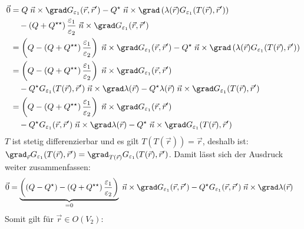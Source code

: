 		  	\begin{equation}\begin{split}
		  			\vec{0} &= Q \; \vec{n}\times \grad G_{\varepsilon_1}(\vec{r} , \vec{r}' ) - Q^\star\; \vec{n}\times\grad \left( \lambda(\vec{r} ) G_{\varepsilon_1}(T(\vec{r} ), \vec{r}' ) \right)\\
		  			&\quad - \left( Q +  Q^{\star\star}\right) \frac{\varepsilon_1}{\varepsilon_2}\; \vec{n}\times \grad  G_{\varepsilon_1}(\vec{r} , \vec{r}' ) \\
		  			&= \left( Q  - \left( Q +  Q^{\star\star}\right) \frac{\varepsilon_1}{\varepsilon_2} \right)\; \vec{n}\times \grad G_{\varepsilon_1}(\vec{r} , \vec{r}' ) - Q^\star\; \vec{n}\times\grad \left( \lambda(\vec{r} ) G_{\varepsilon_1}(T(\vec{r} ), \vec{r}' ) \right)\\
		  			&= \left( Q  - \left( Q +  Q^{\star\star}\right) \frac{\varepsilon_1}{\varepsilon_2} \right)\; \vec{n}\times \grad G_{\varepsilon_1}(\vec{r} , \vec{r}' )  \\
		  			&\quad - Q^\star G_{\varepsilon_1}(T(\vec{r} ), \vec{r}' )\; \vec{n}\times\grad \lambda(\vec{r} ) - Q^\star\lambda(\vec{r} ) \; \vec{n}\times\grad G_{\varepsilon_1}(T(\vec{r} ), \vec{r}' ) \\
		  			&= \left( Q  - \left( Q +  Q^{\star\star}\right) \frac{\varepsilon_1}{\varepsilon_2} \right)\; \vec{n}\times \grad G_{\varepsilon_1}(\vec{r} , \vec{r}' )  \\
		  			&\quad - Q^\star G_{\varepsilon_1}(\vec{r} , \vec{r}' )\; \vec{n}\times\grad \lambda(\vec{r} ) - Q^\star \; \vec{n}\times\grad G_{\varepsilon_1}(T(\vec{r} ), \vec{r}' )
		  	\end{split}\end{equation}
		  	 $T$ ist stetig differenzierbar und es gilt $T(T(\vec{r} ))=\vec{r} $, deshalb ist: $\grad _{\vec{r} } G_{\varepsilon_1}(T(\vec{r} ), \vec{r}' )  = \grad _{T(\vec{r} )} G_{\varepsilon_1}(T(\vec{r} ), \vec{r}' )$.
		  	 Damit lässt sich der Ausdruck weiter zusammenfassen:
		  	\begin{equation}\begin{split}
		  			\vec{0} &= \underbrace{\left( \left(Q - Q^\star\right) - \left( Q +  Q^{\star\star}\right) \frac{\varepsilon_1}{\varepsilon_2} \right)}_{=0}\; \vec{n}\times \grad G_{\varepsilon_1}(\vec{r} , \vec{r}' )   - Q^\star G_{\varepsilon_1}(\vec{r} , \vec{r}' )\; \vec{n}\times\grad \lambda(\vec{r} )
		  	\end{split}\end{equation}
		  	 Somit gilt für $\vec{r} \in O(V_2)$:
